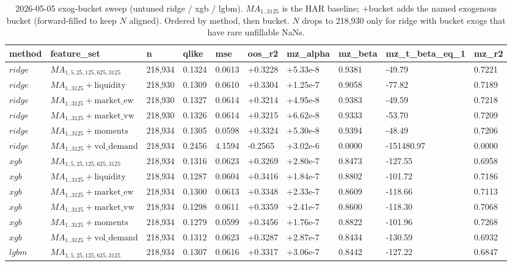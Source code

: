 \documentclass{article}
\begin{document}
\begin{table}[t]
\centering
\caption{2026-05-05 exog-bucket sweep (untuned ridge / xgb / lgbm). $MA_{1..3125}$ is the HAR baseline; $+\mathrm{bucket}$ adds the named exogenous bucket (forward-filled to keep $N$ aligned). Ordered by method, then bucket. $N$ drops to 218{,}930 only for ridge with bucket exogs that have rare unfillable NaNs.}
\label{tab:master_exog_sweep}
\begin{tabular}{llllllllll}
\toprule
method & feature\_set & n & qlike & mse & oos\_r2 & mz\_alpha & mz\_beta & mz\_t\_beta\_eq\_1 & mz\_r2 \\
\midrule
$ridge$ & $MA_{1,5,25,125,625,3125}$ & 218,934 & 0.1324 & 0.0613 & +0.3228 & +5.33e-8 & 0.9381 & -49.79 & 0.7221 \\
$ridge$ & $MA_{1..3125}+\mathrm{liquidity}$ & 218,930 & 0.1309 & 0.0610 & +0.3304 & +1.25e-7 & 0.9058 & -77.82 & 0.7189 \\
$ridge$ & $MA_{1..3125}+\mathrm{market\_ew}$ & 218,930 & 0.1327 & 0.0614 & +0.3214 & +4.95e-8 & 0.9383 & -49.59 & 0.7218 \\
$ridge$ & $MA_{1..3125}+\mathrm{market\_vw}$ & 218,930 & 0.1326 & 0.0614 & +0.3215 & +6.62e-8 & 0.9333 & -53.70 & 0.7209 \\
$ridge$ & $MA_{1..3125}+\mathrm{moments}$ & 218,934 & 0.1305 & 0.0598 & +0.3324 & +5.30e-8 & 0.9394 & -48.49 & 0.7206 \\
$ridge$ & $MA_{1..3125}+\mathrm{vol\_demand}$ & 218,934 & 0.2456 & 4.1594 & -0.2565 & +3.02e-6 & 0.0000 & -151480.97 & 0.0000 \\
$xgb$ & $MA_{1,5,25,125,625,3125}$ & 218,934 & 0.1316 & 0.0623 & +0.3269 & +2.80e-7 & 0.8473 & -127.55 & 0.6958 \\
$xgb$ & $MA_{1..3125}+\mathrm{liquidity}$ & 218,934 & 0.1287 & 0.0604 & +0.3416 & +1.84e-7 & 0.8802 & -101.72 & 0.7186 \\
$xgb$ & $MA_{1..3125}+\mathrm{market\_ew}$ & 218,934 & 0.1300 & 0.0613 & +0.3348 & +2.33e-7 & 0.8609 & -118.66 & 0.7113 \\
$xgb$ & $MA_{1..3125}+\mathrm{market\_vw}$ & 218,934 & 0.1298 & 0.0611 & +0.3359 & +2.41e-7 & 0.8600 & -118.30 & 0.7068 \\
$xgb$ & $MA_{1..3125}+\mathrm{moments}$ & 218,934 & 0.1279 & 0.0599 & +0.3456 & +1.76e-7 & 0.8822 & -101.96 & 0.7268 \\
$xgb$ & $MA_{1..3125}+\mathrm{vol\_demand}$ & 218,934 & 0.1312 & 0.0623 & +0.3287 & +2.87e-7 & 0.8434 & -130.59 & 0.6932 \\
$lgbm$ & $MA_{1,5,25,125,625,3125}$ & 218,934 & 0.1307 & 0.0616 & +0.3317 & +3.06e-7 & 0.8442 & -127.22 & 0.6847 \\

\end{tabular}
\end{table}
\end{document}

